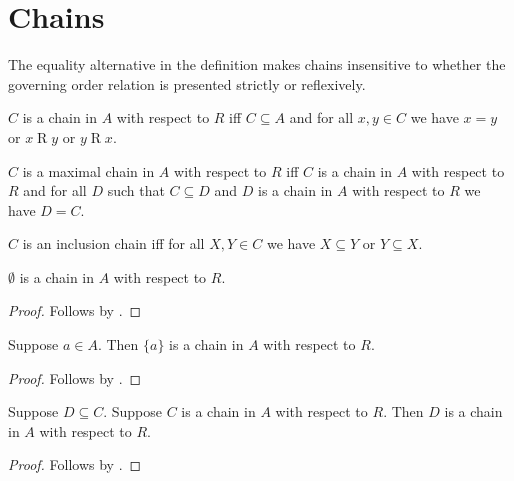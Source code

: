 \section{Chains}



The equality alternative in the definition makes chains insensitive to
whether the governing order relation is presented strictly or reflexively.

\begin{definition}\label{chain_in_relation}
    $C$ is a chain in $A$ with respect to $R$ iff
        $C\subseteq A$ and for all $x,y\in C$ we have
            $x=y$ or $x\mathrel{R}y$ or $y\mathrel{R}x$.
\end{definition}

\begin{definition}\label{maximal_chain_in_relation}
    $C$ is a maximal chain in $A$ with respect to $R$ iff
        $C$ is a chain in $A$ with respect to $R$ and
        for all $D$ such that $C\subseteq D$ and
            $D$ is a chain in $A$ with respect to $R$ we have $D=C$.
\end{definition}

\begin{definition}\label{inclusion_chain}
    $C$ is an inclusion chain iff for all $X,Y\in C$ we have
        $X\subseteq Y$ or $Y\subseteq X$.
\end{definition}

\begin{proposition}\label{emptyset_chain}
    $\emptyset$ is a chain in $A$ with respect to $R$.
\end{proposition}
\begin{proof}
    Follows by .
\end{proof}

\begin{proposition}\label{singleton_chain}
    Suppose $a\in A$.
    Then $\{a\}$ is a chain in $A$ with respect to $R$.
\end{proposition}
\begin{proof}
    Follows by .
\end{proof}

\begin{proposition}\label{subset_of_chain_is_chain}
    Suppose $D\subseteq C$.
    Suppose $C$ is a chain in $A$ with respect to $R$.
    Then $D$ is a chain in $A$ with respect to $R$.
\end{proposition}
\begin{proof}
    Follows by .
\end{proof}

